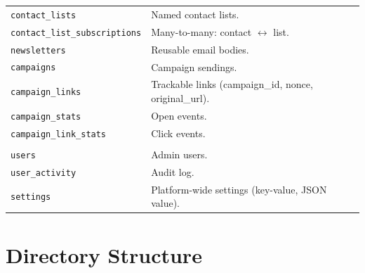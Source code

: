 \documentclass[11pt,a4paper]{article}
\begin{document}
\begin{longtable}{>{\raggedright\arraybackslash}p{4.0cm}l}
\texttt{contact\_lists} & Named contact lists. \\
\texttt{contact\_list\_subscriptions} & Many-to-many: contact $\leftrightarrow$ list. \\
\texttt{newsletters} & Reusable email bodies. \\
\texttt{campaigns} & Campaign sendings. \\
\texttt{campaign\_links} & Trackable links (campaign\_id, nonce, original\_url). \\
\texttt{campaign\_stats} & Open events. \\
\texttt{campaign\_link\_stats} & Click events. \\
\midrule
\multicolumn{2}{l}{\textbf{Admin}} \\
\texttt{users} & Admin users. \\
\texttt{user\_activity} & Audit log. \\
\texttt{settings} & Platform-wide settings (key-value, JSON value). \\
\end{longtable}

\section{Directory Structure}\label{sec:directory}
\end{document}
